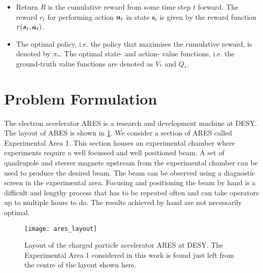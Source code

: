 \begin{itemize}
    \item Return $R$ is the cumulative reward from some time step $t$ forward. The reward $r_t$ for performing action $\bm{a}_t$ in state $\bm{s}_t$ is given by the reward function $r(\bm{s}_t, \bm{a}_t)$.
    \item The optimal policy, i.e. the policy that maximises the cumulative reward, is denoted by $\pi_*$. The optimal state- and action- value functions, i.e. the ground-truth value functions are denoted as $V_*$ and $Q_*$.
\end{itemize}

\section{Problem Formulation}

The electron accelerator ARES is a research and development machine at DESY. The layout of ARES is shown in \cref{fig:ares_layout}. We consider a section of ARES called Experimental Area 1. This section houses an experimental chamber where experiments require a well focussed and well positioned beam. A set of quadrupole and steerer magnets upstream from the experimental chamber can be used to produce the desired beam. The beam can be observed using a diagnostic screen in the experimental area. Focusing and positioning the beam by hand is a difficult and lengthy process that has to be repeated often and can take operators up to multiple hours to do. The results achieved by hand are not necessarily optimal.

\begin{figure}
    \centering
    \texttt{[image: ares\_layout]}
    \caption{Layout of the charged particle accelerator ARES at DESY. The Experimental Area 1 considered in this work is found just left from the centre of the layout shown here.}
    \label{fig:ares_layout}
\end{figure}

